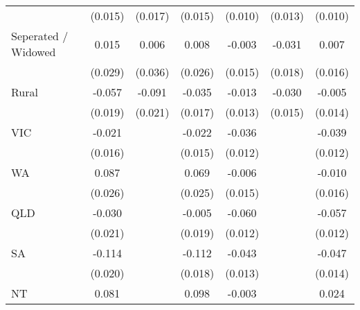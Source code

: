 {\begin{tabular}{l*{6}{c}}
                    &     (0.015)         &     (0.017)         &     (0.015)         &     (0.010)         &     (0.013)         &     (0.010)         \\
Seperated / Widowed &       0.015         &       0.006         &       0.008         &      -0.003         &      -0.031\sym{*}  &       0.007         \\
                    &     (0.029)         &     (0.036)         &     (0.026)         &     (0.015)         &     (0.018)         &     (0.016)         \\
Rural               &      -0.057\sym{***}&      -0.091\sym{***}&      -0.035\sym{**} &      -0.013         &      -0.030\sym{**} &      -0.005         \\
                    &     (0.019)         &     (0.021)         &     (0.017)         &     (0.013)         &     (0.015)         &     (0.014)         \\
VIC                 &      -0.021         &                     &      -0.022         &      -0.036\sym{***}&                     &      -0.039\sym{***}\\
                    &     (0.016)         &                     &     (0.015)         &     (0.012)         &                     &     (0.012)         \\
WA                  &       0.087\sym{***}&                     &       0.069\sym{***}&      -0.006         &                     &      -0.010         \\
                    &     (0.026)         &                     &     (0.025)         &     (0.015)         &                     &     (0.016)         \\
QLD                 &      -0.030         &                     &      -0.005         &      -0.060\sym{***}&                     &      -0.057\sym{***}\\
                    &     (0.021)         &                     &     (0.019)         &     (0.012)         &                     &     (0.012)         \\
SA                  &      -0.114\sym{***}&                     &      -0.112\sym{***}&      -0.043\sym{***}&                     &      -0.047\sym{***}\\
                    &     (0.020)         &                     &     (0.018)         &     (0.013)         &                     &     (0.014)         \\
NT                  &       0.081         &                     &       0.098         &      -0.003         &                     &       0.024         \\

\end{tabular}}
